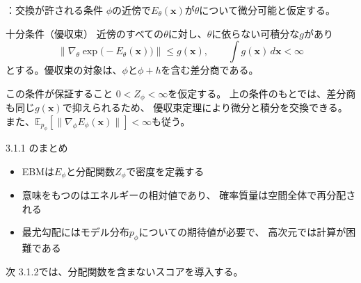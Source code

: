 \assuppl
\begin{frame}{\supplmark：交換が許される条件}
    $\phi$の近傍で$E_\theta(\bm{x})$が$\theta$について微分可能と仮定する。
    \begin{exampleblock}{十分条件（優収束）}
        近傍のすべての$\theta$に対し、$\theta$に依らない可積分な$g$があり
        \[
            \bigl\|\nabla_\theta\exp\!\bigl(-E_\theta(\bm{x})\bigr)\bigr\|
            \le g(\bm{x}),
            \qquad
            \int g(\bm{x})\,d\bm{x}<\infty
\]
        とする。優収束の対象は、$\phi$と$\phi+h$を含む差分商である。
    \end{exampleblock}
    \begin{exampleblock}{この条件が保証すること}
        $0<Z_\phi<\infty$を仮定する。
        上の条件のもとでは、差分商も同じ$g(\bm{x})$で抑えられるため、
        優収束定理により微分と積分を交換できる。
        また、$\mathbb{E}_{p_\phi}[\|\nabla_\phi E_\phi(\bm{x})\|]<\infty$も従う。
    \end{exampleblock}
\end{frame}
\asmain
\begin{frame}{3.1.1 のまとめ}
    \begin{itemize}
        \item EBMは$E_\phi$と分配関数$Z_\phi$で密度を定義する
        \item 意味をもつのはエネルギーの相対値であり、
        確率質量は空間全体で再分配される
        \item 最尤勾配にはモデル分布$p_\phi$についての期待値が必要で、
        高次元では計算が困難である
    \end{itemize}
    \begin{block}{次}
        3.1.2では、分配関数を含まないスコアを導入する。
    \end{block}
\end{frame}
